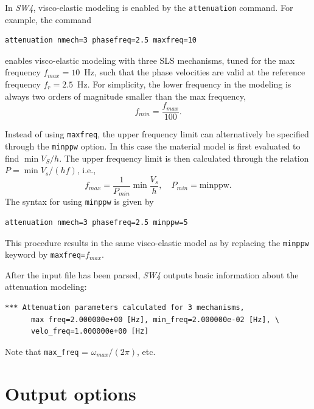 \documentclass[11pt]{report}
\begin{document}
In \emph{SW4}, visco-elastic modeling is enabled by the {\tt attenuation} command. For example, the
command
\begin{verbatim}
attenuation nmech=3 phasefreq=2.5 maxfreq=10
\end{verbatim}
enables visco-elastic modeling with three SLS mechanisms, tuned for the max frequency
$f_{max}=10$~Hz, such that the phase velocities are valid at the reference frequency
$f_r=2.5$~Hz. For simplicity, the lower frequency in the modeling is always two orders of
magnitude smaller than the max frequency,
\[
f_{min}=\frac{f_{max}}{100}.
\]

Instead of using \verb+maxfreq+, the upper frequency limit can alternatively be specified through the
\verb+minppw+ option. In this case the material model is first evaluated to find $\min V_S/h$. The
upper frequency limit is then calculated through the relation $P=\min V_s/(h
f)$, i.e.,
\[
f_{max} = \frac{1}{P_{min}}\min \frac{V_s}{h},\quad P_{min}=\mbox{minppw}.
\]
The syntax for using \verb+minppw+ is given by
\begin{verbatim}
attenuation nmech=3 phasefreq=2.5 minppw=5
\end{verbatim}
This procedure results in the same visco-elastic model as by replacing the \verb+minppw+ keyword by \verb+maxfreq=+$f_{max}$.

After the input file has been parsed, \emph{SW4} outputs basic information about the attenuation
modeling:
\begin{verbatim}
*** Attenuation parameters calculated for 3 mechanisms, 
      max freq=2.000000e+00 [Hz], min_freq=2.000000e-02 [Hz], \
      velo_freq=1.000000e+00 [Hz]
\end{verbatim}
Note that \verb+max_freq+ = $\omega_{max}/(2\pi)$, etc.


\chapter{Output options}
\end{document}
